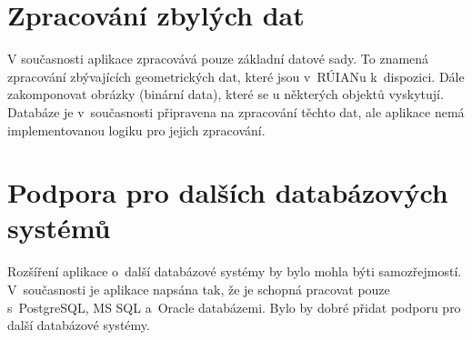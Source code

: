 \section*{Zpracování zbylých dat}
V současnosti aplikace zpracovává pouze základní datové sady.
To znamená zpracování zbývajících geometrických dat, které jsou
v~RÚIANu k~dispozici. Dále zakomponovat obrázky (binární data),
které se u některých objektů vyskytují.
Databáze je v~současnosti připravena na zpracování těchto dat,
ale aplikace nemá implementovanou logiku pro jejich zpracování.


\section*{Podpora pro dalších databázových systémů}
Rozšíření aplikace o~další databázové systémy by bylo mohla
býti samozřejmostí. V~současnosti je aplikace napsána tak,
že je schopná pracovat pouze s~PostgreSQL, MS SQL a~Oracle databázemi.
Bylo by dobré přidat podporu pro další databázové systémy.